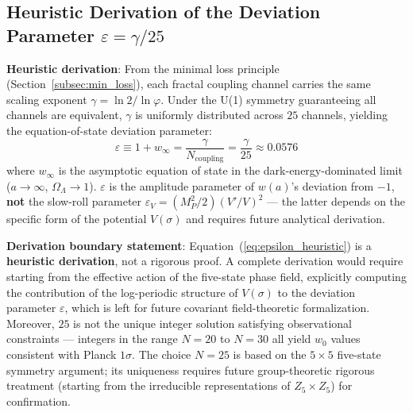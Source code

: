 \documentclass[12pt,a4paper,twocolumn]{article}
\renewcommand{\phi}{\varphi}
\begin{document}
\subsection{Heuristic Derivation of the Deviation Parameter $\varepsilon = \gamma/25$}
\label{subsec:epsilon_heuristic}

\textbf{Heuristic derivation}: From the minimal loss principle (Section~\ref{subsec:min_loss}), each fractal coupling channel carries the same scaling exponent $\gamma = \ln 2 / \ln \phi$. Under the U(1) symmetry guaranteeing all channels are equivalent, $\gamma$ is uniformly distributed across $25$ channels, yielding the equation-of-state deviation parameter:
\begin{equation}
\varepsilon \equiv 1 + w_\infty = \frac{\gamma}{N_{\text{coupling}}} = \frac{\gamma}{25} \approx 0.0576
\label{eq:epsilon_heuristic}
\end{equation}
where $w_\infty$ is the asymptotic equation of state in the dark-energy-dominated limit ($a\to\infty$, $\Omega_\Lambda\to 1$). $\varepsilon$ is the amplitude parameter of $w(a)$'s deviation from $-1$, \textbf{not} the slow-roll parameter $\varepsilon_V = (M_P^2/2)(V'/V)^2$ --- the latter depends on the specific form of the potential $V(\sigma)$ and requires future analytical derivation.

\textbf{Derivation boundary statement}: Equation~(\ref{eq:epsilon_heuristic}) is a \textbf{heuristic derivation}, not a rigorous proof. A complete derivation would require starting from the effective action of the five-state phase field, explicitly computing the contribution of the log-periodic structure of $V(\sigma)$ to the deviation parameter $\varepsilon$, which is left for future covariant field-theoretic formalization. Moreover, $25$ is not the unique integer solution satisfying observational constraints --- integers in the range $N=20$ to $N=30$ all yield $w_0$ values consistent with Planck $1\sigma$. The choice $N=25$ is based on the $5\times 5$ five-state symmetry argument; its uniqueness requires future group-theoretic rigorous treatment (starting from the irreducible representations of $Z_5 \times Z_5$) for confirmation.
\end{document}

